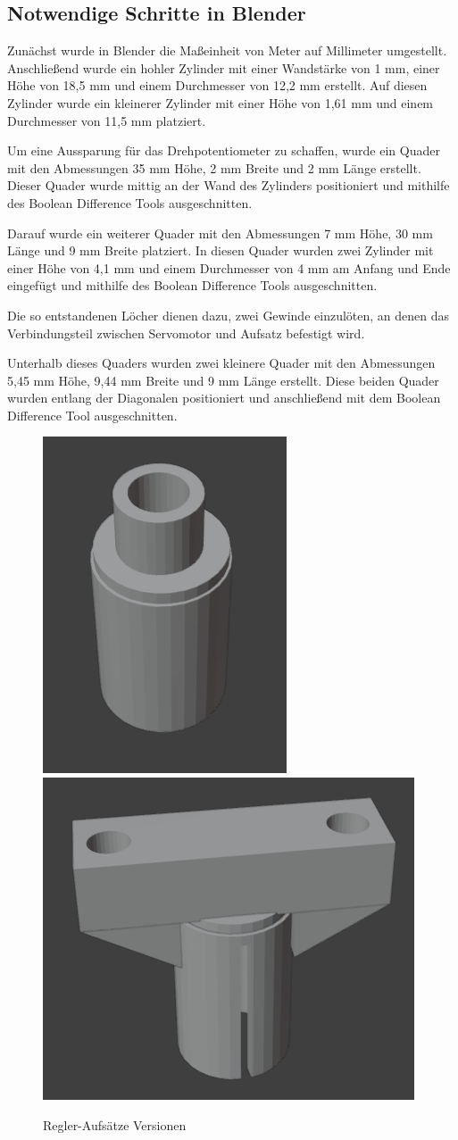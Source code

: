 \newpage
\subsection{Notwendige Schritte in Blender}
Zunächst wurde in Blender die Maßeinheit von Meter auf Millimeter umgestellt. Anschließend wurde ein hohler Zylinder mit einer Wandstärke von 1 mm, einer Höhe von 18,5 mm und einem Durchmesser von 12,2 mm erstellt. Auf diesen Zylinder wurde ein kleinerer Zylinder mit einer Höhe von 1,61 mm und einem Durchmesser von 11,5 mm platziert.  

Um eine Aussparung für das Drehpotentiometer zu schaffen, wurde ein Quader mit den Abmessungen 35 mm Höhe, 2 mm Breite und 2 mm Länge erstellt. Dieser Quader wurde mittig an der Wand des Zylinders positioniert und mithilfe des Boolean Difference Tools ausgeschnitten.  

Darauf wurde ein weiterer Quader mit den Abmessungen 7 mm Höhe, 30 mm Länge und 9 mm Breite platziert. In diesen Quader wurden zwei Zylinder mit einer Höhe von 4,1 mm und einem Durchmesser von 4 mm am Anfang und Ende eingefügt und mithilfe des Boolean Difference Tools ausgeschnitten.  

Die so entstandenen Löcher dienen dazu, zwei Gewinde einzulöten, an denen das Verbindungsteil zwischen Servomotor und Aufsatz befestigt wird.

Unterhalb dieses Quaders wurden zwei kleinere Quader mit den Abmessungen 5,45 mm Höhe, 9,44 mm Breite und 9 mm Länge erstellt. Diese beiden Quader wurden entlang der Diagonalen positioniert und anschließend mit dem Boolean Difference Tool ausgeschnitten.

\begin{figure}[H]
	\centering
	\includegraphics[width=0.25\linewidth]{images/ReglerV1.png}
	\includegraphics[width=0.398\linewidth]{images/Regler.png}
	\caption[Regler-Aufsätze Versionen]{Regler-Aufsätze Versionen}
	\label{fig:Regler-Aufsätze Versionen}
\end{figure}


